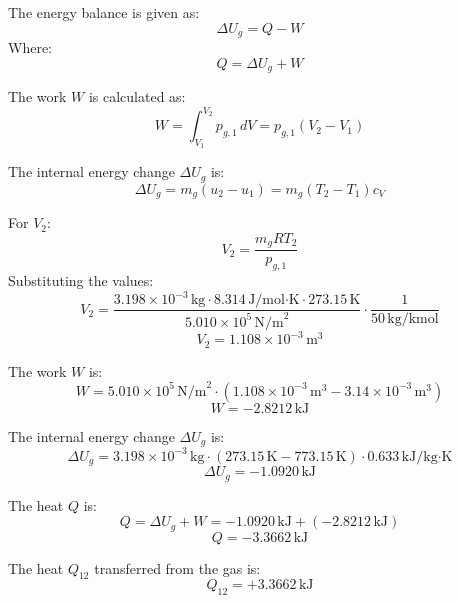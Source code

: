 The energy balance is given as:  
\[
\Delta U_g = Q - W
\]  
Where:  
\[
Q = \Delta U_g + W
\]  

The work \( W \) is calculated as:  
\[
W = \int_{V_1}^{V_2} p_{g,1} \, dV = p_{g,1} (V_2 - V_1)
\]  

The internal energy change \( \Delta U_g \) is:  
\[
\Delta U_g = m_g (u_2 - u_1) = m_g (T_2 - T_1) c_V
\]  

For \( V_2 \):  
\[
V_2 = \frac{m_g R T_2}{p_{g,1}}
\]  
Substituting the values:  
\[
V_2 = \frac{3.198 \times 10^{-3} \, \text{kg} \cdot 8.314 \, \text{J/mol·K} \cdot 273.15 \, \text{K}}{5.010 \times 10^5 \, \text{N/m}^2} \cdot \frac{1}{50 \, \text{kg/kmol}}
\]  
\[
V_2 = 1.108 \times 10^{-3} \, \text{m}^3
\]  

The work \( W \) is:  
\[
W = 5.010 \times 10^5 \, \text{N/m}^2 \cdot (1.108 \times 10^{-3} \, \text{m}^3 - 3.14 \times 10^{-3} \, \text{m}^3)
\]  
\[
W = -2.8212 \, \text{kJ}
\]  

The internal energy change \( \Delta U_g \) is:  
\[
\Delta U_g = 3.198 \times 10^{-3} \, \text{kg} \cdot (273.15 \, \text{K} - 773.15 \, \text{K}) \cdot 0.633 \, \text{kJ/kg·K}
\]  
\[
\Delta U_g = -1.0920 \, \text{kJ}
\]  

The heat \( Q \) is:  
\[
Q = \Delta U_g + W = -1.0920 \, \text{kJ} + (-2.8212 \, \text{kJ})
\]  
\[
Q = -3.3662 \, \text{kJ}
\]  

The heat \( Q_{12} \) transferred from the gas is:  
\[
Q_{12} = +3.3662 \, \text{kJ}
\]